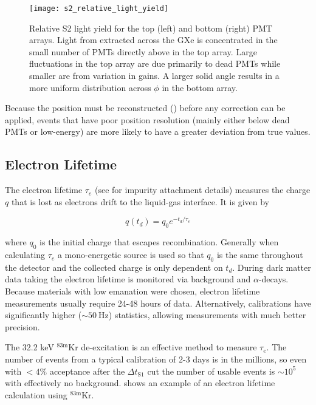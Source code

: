 \begin{figure}
\centering
\texttt{[image: s2\_relative\_light\_yield]}
\caption{Relative S2 light yield for the top (left) and bottom (right) PMT arrays.  Light from \electron extracted across the GXe is
concentrated in the small number of PMTs directly above in the top array.  Large fluctuations in the top array are due primarily to dead
PMTs while
smaller are from variation in gains.  A larger solid angle results in a more uniform distribution across $\phi$ in the bottom array.}
\label{fig:calibrations_s2_maps}
\end{figure}

Because the position must be reconstructed () before any correction can be
applied, events that have poor position resolution (mainly either below dead PMTs or low-energy) are more likely to have a greater
deviation from true values.



\subsection{Electron Lifetime}
\label{subsec:det_char_elifetime}
The electron lifetime $\tau_{e}$ (see  for impurity attachment details) measures the charge $q$
that is lost as electrons drift to the liquid-gas interface.  It is given by

\begin{equation}
q(t_d) = q_0 e^{-t_d / \tau_{e}}
\label{eq:det_char_elifetime}
\end{equation}

\noindent where $q_0$ is the initial charge that escapes recombination.  Generally when calculating $\tau_{e}$ a mono-energetic source is
used so that $q_0$ is the same throughout the detector and the collected charge is only dependent on $t_d$.  During dark matter data
taking the electron lifetime is monitored via background
 and  $\alpha$-decays.  Because materials with low 
emanation were chosen, electron lifetime measurements usually require 24-48 hours of data.  Alternatively, calibrations
have significantly higher (${\sim}50\ \mathrm{Hz}$) statistics, allowing measurements with much better precision.

The 32.2 keV $\mathrm{^{83m}Kr}$ de-excitation is an effective method to measure $\tau_{e}$.  The number of events
from a typical calibration of 2-3 days is in the millions, so even with $< 4\%$ acceptance after the $\Delta t_{\mathrm{S1}}$ cut the
number of usable events
is ${\sim}10^5$ with effectively no background.   shows an example of an electron lifetime calculation
using $\mathrm{^{83m}Kr}$.

